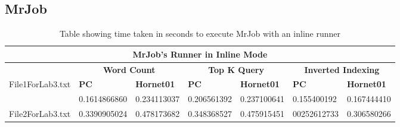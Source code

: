 \documentclass[10pt, onecolumn]{article}
\begin{document}
\subsection{MrJob}
\begin{table}[H]
\centering
\caption{Table showing time taken in seconds to execute MrJob with an inline runner}
\label{tbl:MrJobInlineRunnerResults}
\begin{tabular}{|l|l|l|l|l|l|l|}
\hline
\multicolumn{7}{|c|}{\textbf{MrJob's Runner in Inline Mode}}                                                                                                                                                \\ \hline
\textbf{}                         & \multicolumn{2}{c|}{\textbf{Word Count}}                                  & \multicolumn{2}{c|}{\textbf{Top K Query}} & \multicolumn{2}{c|}{\textbf{Inverted Indexing}} \\ \hline
\multirow{2}{*}{File1ForLab3.txt} & \multicolumn{1}{l|}{\textbf{PC}} & \multicolumn{1}{l|}{\textbf{Hornet01}} & \textbf{PC}      & \textbf{Hornet01}      & \textbf{PC}         & \textbf{Hornet01}         \\ \cline{2-7} 
                                  & 0.1614866860                     & 0.234113037                            & 0.206561392      & 0.237100641            & 0.155400192         & 0.167444410               \\ \hline
File2ForLab3.txt                  & 0.3390905024                     & 0.478173682                            & 0.348368527      & 0.475915451            & 00252612733         & 0.306580266               \\ \hline
\end{tabular}
\end{table}
\end{document}
